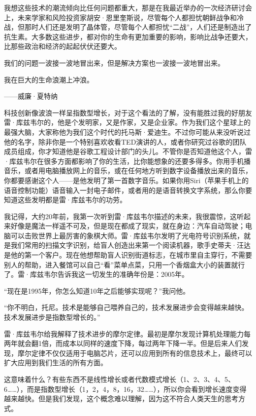 我想这些技术的潮流倾向比任何问题都重大，那是在我最近举办的一次经济研讨会上，未来学家和风险投资家胡安·恩里奎斯说，尽管每个人都担忧朝鲜战争和冷战，但那时人们还是发明了晶体管，尽管每个人都担忧“二战”，人们还是制造出了抗生素。大多数这些进步，都对你的生命有更加重要的影响，影响比战争还要大，比那些政治和经济的起起伏伏还要大。

我们的问题一波接一波地冒出来，但是解决方案也一波接一波地冒出来。

\begin{BookQuote}
我在巨大的生命浪潮上冲浪。

\hfill ——威廉·夏特纳
\end{BookQuote}

科技创新像波浪一样呈指数型增长，对于这个看法的了解，没有能胜过我的好朋友雷·库兹韦尔的，他是个发明家，又是作家，又是企业家。作为我们这个星球上的最强大脑，大家称他为我们这个时代的托马斯·爱迪生。不过你可能从来没听说过他的名字，除非你是一个特别喜欢收看TED演讲的人，或者你研究过谷歌的团队成员组成，你才知道他是谷歌工程设计部门的头儿。不管你是否知道他这个人，雷·库兹韦尔在很多方面都影响了你的生活，比你能想象的还要多得多。你用手机播音乐，或者用电脑播放网上的音乐，或在任何地方听到数字设备播放出来的音乐，你都要感谢这个人——是他发明了第一首数字音乐。如果你用Siri（苹果手机上的语音控制功能）语音输入一封电子邮件，或者用的是语音转换文字系统，那么你要知道这些发明都是雷·库兹韦尔的功劳。

我记得，大约20年前，我第一次听到雷·库兹韦尔描述的未来，我很震惊，这听起来好像是魔法一样遥不可及，但是现在都成了现实，就在身边：汽车自动驾驶；电脑可以击败世界上最厉害的象棋大师。雷·库兹韦尔发明了光电符号识别系统，就是我们常用的扫描文字识别，给盲人创造出来第一个阅读机器，歌手史蒂夫·汪达是他的第一个客户。现在他想帮助盲人识别街道标志，在城市里自主穿行，不需要别人的帮助，进入餐馆可以自己“看”菜单点菜，只用一个香烟盒大小的装置就行了。雷·库兹韦尔告诉我这一切发生的准确年份是：2005年。

“现在是1995年，你怎么知道10年之后能够实现呢？”我问他。

“你不明白，托尼。技术是能够自己喂养自己的，技术发展进步会变得越来越快。技术发展进步是指数型增长的。”

雷·库兹韦尔给我解释了技术进步的摩尔定律。最初是摩尔发现计算机处理能力每两年就会翻1倍，而成本以同样的速度下降，每过两年下降一半。但是后来人们发现，摩尔定律不仅仅适用于电脑芯片，还可以应用到所有的信息技术上，最终可以扩大应用到我们生活的所有方面。

这意味着什么？有些东西不是线性增长或者代数模式增长（1、2、3、4、5、6……），而是指数型增长（1，2，4，8，16，32……），所以你会看到增长速度变得越来越快。但是我们发现，这个概念难以理解，因为这不符合人类天生的思考方式。

